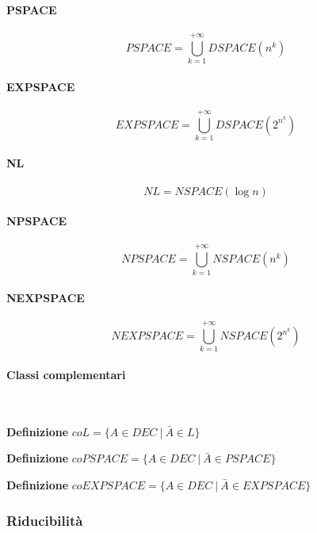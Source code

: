 \documentclass{article}
\begin{document}
\paragraph{PSPACE}

$$PSPACE=\bigcup_{k=1}^{+\infty}DSPACE(n^k)$$\newline

\paragraph{EXPSPACE}

$$EXPSPACE=\bigcup_{k=1}^{+\infty}DSPACE(2^{n^k})$$\newline

\paragraph{NL}

$$NL=NSPACE(\log n)$$\newline

\paragraph{NPSPACE}

$$NPSPACE=\bigcup_{k=1}^{+\infty}NSPACE(n^k)$$\newline

\paragraph{NEXPSPACE}

$$NEXPSPACE=\bigcup_{k=1}^{+\infty}NSPACE(2^{n^k})$$

\paragraph{Classi complementari} $\ $\newline

\noindent\textbf{Definizione} $coL=\{A\in DEC\ |\ \bar{A}\in L\}$\newline

\noindent\textbf{Definizione} $coPSPACE=\{A\in DEC\ |\ \bar{A}\in PSPACE\}$\newline

\noindent\textbf{Definizione} $coEXPSPACE=\{A\in DEC\ |\ \bar{A}\in EXPSPACE\}$

\subsubsection{Riducibilità}
\end{document}
